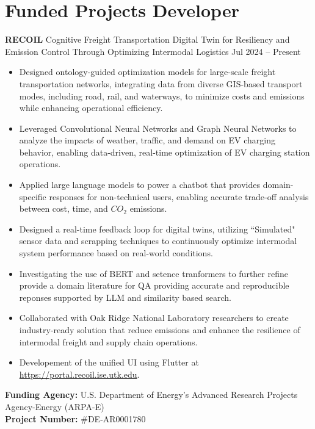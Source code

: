 \documentclass[10pt, letterpaper]{article}
\newenvironment{highlights}{
    \begin{itemize}[
        topsep=0.10 cm,
        parsep=0.10 cm,
        partopsep=0pt,
        itemsep=0pt,
        leftmargin=0 cm + 10pt
    ]
}{
    \end{itemize}
} %
\newenvironment{twocolentry}[2][]{
    \onecolentry
    \def\secondColumn{#2}
    \setcolumnwidth{\fill, 4.5 cm}
    \begin{paracol}{2}
}{
    \switchcolumn \raggedleft \secondColumn
    \end{paracol}
    \endonecolentry
} %
\begin{document}
        \section*{Funded Projects Developer}
        \begin{twocolentry}{Jul 2024 – Present} \textbf{RECOIL} \textbar Cognitive Freight Transportation Digital Twin for Resiliency and Emission Control Through Optimizing Intermodal Logistics \end{twocolentry} \begin{highlights} 
            \item Designed ontology-guided optimization models for large-scale freight transportation networks, integrating data from diverse GIS-based transport modes, including road, rail, and waterways, to minimize costs and emissions while enhancing operational efficiency. 
            \item Leveraged Convolutional Neural Networks and Graph Neural Networks to analyze the impacts of weather, traffic, and demand on EV charging behavior, enabling data-driven, real-time optimization of EV charging station operations. 
            \item Applied large language models to power a chatbot that provides domain-specific responses for non-technical users, enabling accurate trade-off analysis between cost, time, and $CO_2$ emissions.
            \item Designed a real-time feedback loop for digital twins, utilizing ``Simulated" sensor data and scrapping techniques to continuously optimize intermodal system performance based on real-world conditions.
            \item Investigating the use of BERT and setence tranformers to further refine provide a domain literature for QA providing accurate and reproducible reponses supported by LLM and similarity based search.
            \item Collaborated with Oak Ridge National Laboratory researchers to create industry-ready solution that reduce emissions and enhance the resilience of intermodal freight and supply chain operations.
            \item Developement of the unified UI using Flutter at \url{https://portal.recoil.ise.utk.edu}.
            
            \end{highlights} \vspace{0.3cm} \noindent \textbf{Funding Agency:} U.S. Department of Energy’s Advanced Research Projects Agency-Energy (ARPA-E)\\  \textbf{Project Number:} \#DE-AR0001780
    
\end{document}

